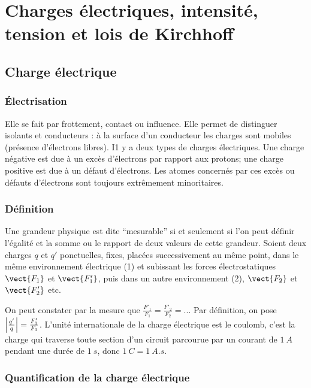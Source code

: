 \chapter{Charges électriques, intensité, tension et lois de Kirchhoff}
\minitoc
\minilof
\minilot

\section{Charge électrique}
\label{chap9-sec:chargeelectrique}

\subsection{Électrisation}
\label{chap9-subsec:electrisation}

Elle se fait par frottement, contact ou influence. Elle permet de distinguer isolants et conducteurs : à la surface d'un conducteur les charges sont mobiles (présence d'électrons libres). I1 y a deux types de charges électriques. Une charge négative est due à un excès d'électrons par rapport aux protons; une charge positive est due à un défaut d'électrons. Les atomes concernés par ces excès ou défauts d'électrons sont toujours extrêmement minoritaires.

\subsection{Définition}
\label{chap9-subsec:definition}

Une grandeur physique est dite ``mesurable'' si et seulement si l'on peut définir l'égalité et la somme ou le rapport de deux valeurs de cette grandeur. Soient deux charges $q$ et $q'$ ponctuelles, fixes, placées successivement au même point, dans le même environnement électrique (1) et subissant les forces électrostatiques $\vect{F_1}$ et $\vect{F'_1}$, puis dans un autre environnement (2), $\vect{F_2}$ et $\vect{F'_2}$ etc.

On peut constater par la mesure que $ \frac{F'_1}{F_1} = \frac{F'_2}{F_2} = ...$ Par définition, on pose $\left\lvert\frac{q'}{q}\right\rvert = \frac{F'_1}{F_1}$.
L'unité internationale de la charge électrique est le coulomb, c'est la charge qui traverse toute section d'un circuit parcourue par un courant de $\SI{1}{A}$ pendant une durée de $\SI{1}{s}$, donc $\SI{1}{C} = \SI{1}{A.s}$.

\subsection{Quantification de la charge électrique}
\label{chap9-subsec:quantificationdelachargeelectrique}


